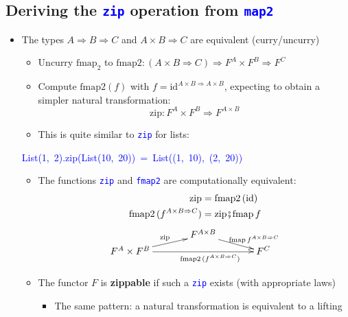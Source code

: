 \subsection{Deriving the \texttt{\textcolor{blue}{\footnotesize{}zip}} operation
from \texttt{\textcolor{blue}{\footnotesize{}map2}} }
\begin{itemize}
\item The types $A\Rightarrow B\Rightarrow C$ and $A\times B\Rightarrow C$
are equivalent (curry/uncurry)
\begin{itemize}
\item Uncurry $\text{fmap}_{2}$ to $\text{fmap2}:\left(A\times B\Rightarrow C\right)\Rightarrow F^{A}\times F^{B}\Rightarrow F^{C}$ 
\item Compute $\text{fmap2}\left(f\right)$ with $f=\text{id}^{A\times B\Rightarrow A\times B}$,
expecting to obtain a simpler natural transformation: 
\[
\text{zip}:F^{A}\times F^{B}\Rightarrow F^{A\times B}
\]
 
\item This is quite similar to \texttt{\textcolor{blue}{\footnotesize{}zip}}
for lists:
\end{itemize}
\begin{lyxcode}
\textcolor{blue}{\footnotesize{}List(1,~2).zip(List(10,~20))~=~List((1,~10),~(2,~20))}~
\end{lyxcode}
\begin{itemize}
\item The functions \texttt{\textcolor{blue}{\footnotesize{}zip}} and \texttt{\textcolor{blue}{\footnotesize{}fmap2}}
are computationally equivalent:{\footnotesize{}
\begin{align*}
\text{zip} & =\text{fmap2}\left(\text{id}\right)\\
\text{fmap2}\,(f^{A\times B\Rightarrow C}) & =\text{zip}\bef\text{fmap}\,f
\end{align*}
\[
\xymatrix{\xyScaleY{0.2pc}\xyScaleX{3pc} & F^{A\times B}\ar[rd]\sp(0.65){\ \ \text{fmap}\,f^{A\times B\Rightarrow C}}\\
F^{A}\times F^{B}\ar[ru]\sp(0.5){\text{zip}}\ar[rr]\sb(0.6){\text{fmap2}\,(f^{A\times B\Rightarrow C})} &  & F^{C}
}
\]
}{\footnotesize\par}
\item The functor $F$ is \textbf{zippable} if such a \texttt{\textcolor{blue}{\footnotesize{}zip}}
exists (with appropriate laws)
\begin{itemize}
\item The same pattern: a natural transformation is equivalent to a lifting
\end{itemize}
\end{itemize}
\end{itemize}


